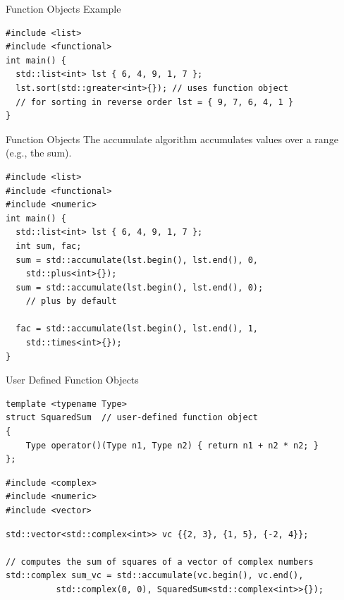 \documentclass[14pt,aspectratio=1610]{beamer}
\begin{document}
\begin{frame}[fragile]{Function Objects Example}
\begin{lstlisting}[basicstyle=\small\ttfamily]
#include <list>
#include <functional>
int main() {
  std::list<int> lst { 6, 4, 9, 1, 7 };
  lst.sort(std::greater<int>{}); // uses function object
  // for sorting in reverse order lst = { 9, 7, 6, 4, 1 }
}
\end{lstlisting}
\end{frame}

\begin{frame}[fragile]{Function Objects}
\small
The accumulate algorithm accumulates values over a range (e.g., the sum).

\begin{lstlisting}[basicstyle=\small\ttfamily]
#include <list>
#include <functional>
#include <numeric>
int main() {
  std::list<int> lst { 6, 4, 9, 1, 7 };
  int sum, fac;
  sum = std::accumulate(lst.begin(), lst.end(), 0,
    std::plus<int>{});
  sum = std::accumulate(lst.begin(), lst.end(), 0);
    // plus by default

  fac = std::accumulate(lst.begin(), lst.end(), 1,
    std::times<int>{});
}
\end{lstlisting}
\end{frame}

\begin{frame}[fragile]{User Defined Function Objects}

\begin{lstlisting}[basicstyle=\footnotesize\ttfamily]
template <typename Type>
struct SquaredSum  // user-defined function object
{
    Type operator()(Type n1, Type n2) { return n1 + n2 * n2; }
};
\end{lstlisting}
\begin{lstlisting}[basicstyle=\footnotesize\ttfamily]
#include <complex>
#include <numeric>
#include <vector>
\end{lstlisting}
\begin{lstlisting}[basicstyle=\footnotesize\ttfamily]
std::vector<std::complex<int>> vc {{2, 3}, {1, 5}, {-2, 4}};

// computes the sum of squares of a vector of complex numbers
std::complex sum_vc = std::accumulate(vc.begin(), vc.end(),
          std::complex(0, 0), SquaredSum<std::complex<int>>{});
\end{lstlisting}
\end{frame}
\end{document}

